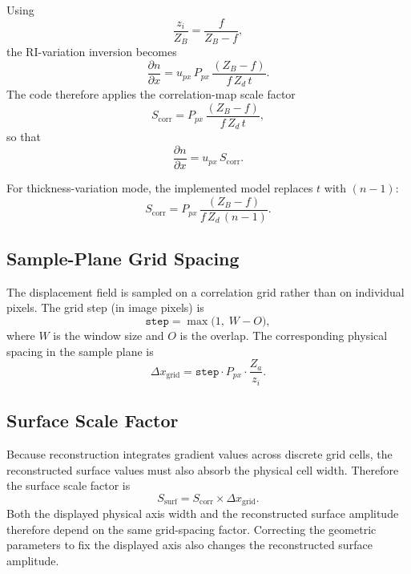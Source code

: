 \documentclass[11pt]{article}
\begin{document}
Using
\begin{equation}
  \frac{z_i}{Z_B} = \frac{f}{Z_B-f},
\end{equation}
the RI-variation inversion becomes
\begin{equation}
  \frac{\partial n}{\partial x}
  =
  u_{px}\,
  P_{px}\,
  \frac{(Z_B - f)}{f\,Z_d\,t}.
\end{equation}
The code therefore applies the correlation-map scale factor
\begin{equation}
  S_{\mathrm{corr}} =
    P_{px}\,\frac{(Z_B - f)}{f\,Z_d\,t},
  \label{eq:scorr_dn}
\end{equation}
so that
\begin{equation}
  \frac{\partial n}{\partial x} = u_{px}\,S_{\mathrm{corr}}.
\end{equation}

For thickness-variation mode, the implemented model replaces $t$ with
$(n-1)$:
\begin{equation}
  S_{\mathrm{corr}} =
    P_{px}\,\frac{(Z_B - f)}{f\,Z_d\,(n-1)}.
  \label{eq:scorr_mm}
\end{equation}

\subsection{Sample-Plane Grid Spacing}
\label{sec:gridspacing}

The displacement field is sampled on a correlation grid rather than on
individual pixels. The grid step (in image pixels) is
\begin{equation}
  \texttt{step} = \max\!\bigl(1,\; W - O\bigr),
  \label{eq:step}
\end{equation}
where $W$ is the window size and $O$ is the overlap. The corresponding
physical spacing in the sample plane is
\begin{equation}
  \Delta x_{\mathrm{grid}} =
    \texttt{step} \cdot P_{px} \cdot \frac{Z_a}{z_i}.
  \label{eq:dx}
\end{equation}

\subsection{Surface Scale Factor}
\label{sec:surfscale}

Because reconstruction integrates gradient values across discrete grid cells,
the reconstructed surface values must also absorb the physical cell width.
Therefore the surface scale factor is
\begin{equation}
  S_{\mathrm{surf}} = S_{\mathrm{corr}} \times \Delta x_{\mathrm{grid}}.
  \label{eq:ssurf}
\end{equation}
Both the displayed physical axis width and the reconstructed surface
amplitude therefore depend on the same grid-spacing factor. Correcting the
geometric parameters to fix the displayed axis also changes the reconstructed
surface amplitude.
\end{document}
